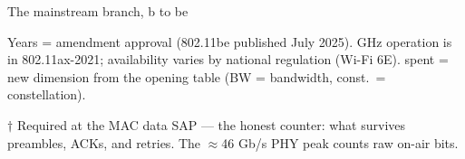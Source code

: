 \begin{frame}{The mainstream branch, b to be}
  \vspace{0.3em}
  {\scriptsize\color{softgray}Years = amendment approval (802.11be published
    July 2025).  GHz operation is in 802.11ax-2021; availability varies
    by national regulation (Wi-Fi 6E). \enspace spent = new dimension from the
    opening table (BW = bandwidth, const.\ = constellation).\par
    $\dagger$ Required at the MAC data SAP --- the honest counter: what survives
    preambles, ACKs, and retries. The $\approx$46 Gb/s PHY peak counts raw
    on-air bits.\par}

  \vspace{0.35em}
\end{frame}

